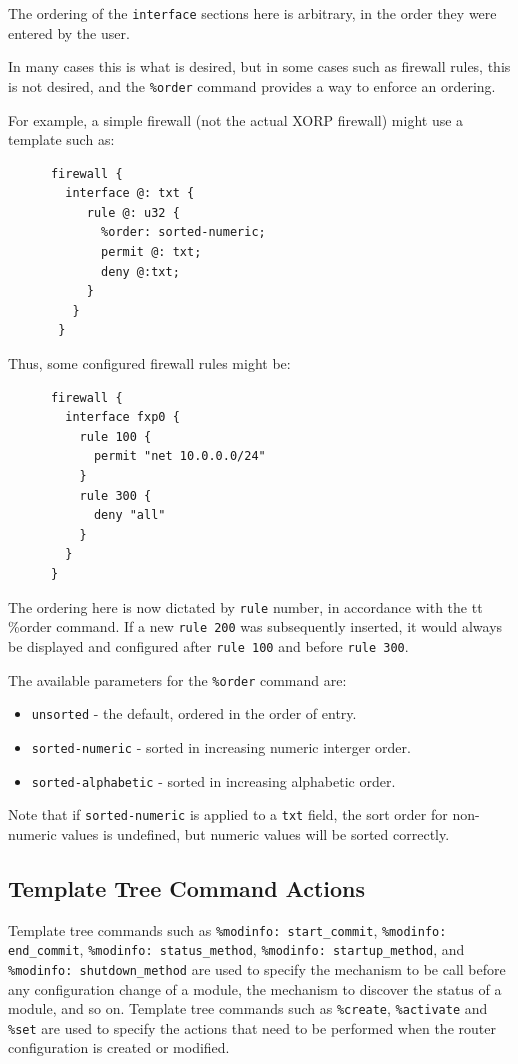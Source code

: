\documentclass[11pt]{article}
\begin{document}
\noindent The ordering of the {\tt interface} sections here is
arbitrary, in the order they were entered by the user.

\noindent In many cases this is what is desired, but in some cases such as
firewall rules, this is not desired, and the {\tt \%order} command
provides a way to enforce an ordering.

\noindent For example, a simple firewall (not the actual XORP firewall) might
use a template such as:
\begin{verbatim}
      firewall {
        interface @: txt {
           rule @: u32 {
             %order: sorted-numeric;
             permit @: txt;
             deny @:txt;
           }
         }
       }
\end{verbatim}

\noindent Thus, some configured firewall rules might be:
\begin{verbatim}
      firewall {
        interface fxp0 {
          rule 100 {
            permit "net 10.0.0.0/24"
          }
          rule 300 {
            deny "all"
          }
        }
      }
\end{verbatim}

\noindent The ordering here is now dictated by {\tt rule} number, in accordance
with the {tt \%order} command.  If a new {\tt rule 200} was
subsequently inserted, it would always be displayed and configured
after {\tt rule 100} and before {\tt rule 300}.

\noindent The available parameters for the {\tt \%order} command are:
\begin{itemize}
\item {\tt unsorted} - the default, ordered in the order of entry.
\item {\tt sorted-numeric} - sorted in increasing numeric interger
  order.
\item {\tt sorted-alphabetic} - sorted in increasing alphabetic order.
\end{itemize}

\noindent Note that if {\tt sorted-numeric} is applied to a {\tt txt}
field, the sort order for non-numeric values is undefined, but numeric
values will be sorted correctly.

\newpage

\subsection{Template Tree Command Actions}

Template tree commands such as {\tt \%modinfo: start\_commit},
{\tt \%modinfo: end\_commit}, {\tt \%modinfo: status\_method},
{\tt \%modinfo: startup\_method}, and {\tt \%modinfo: shutdown\_method}
are used to specify the mechanism to be call before any configuration
change of a module, the mechanism to discover the status of a module, and so
on.
Template tree commands such as {\tt \%create}, {\tt \%activate} and
{\tt \%set} are used to specify the actions that need to be performed
when the router configuration is created or modified.
\end{document}

